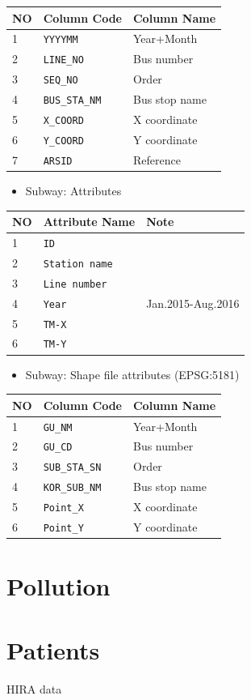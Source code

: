 \documentclass[]{book}
\providecommand{\tightlist}{%
  \setlength{\itemsep}{0pt}\setlength{\parskip}{0pt}}
\begin{document}
\begin{longtable}[]{@{}lll@{}}
\toprule
NO & Column Code & Column Name\tabularnewline
\midrule
\endhead
1 & \texttt{YYYYMM} & Year+Month\tabularnewline
2 & \texttt{LINE\_NO} & Bus number\tabularnewline
3 & \texttt{SEQ\_NO} & Order\tabularnewline
4 & \texttt{BUS\_STA\_NM} & Bus stop name\tabularnewline
5 & \texttt{X\_COORD} & X coordinate\tabularnewline
6 & \texttt{Y\_COORD} & Y coordinate\tabularnewline
7 & \texttt{ARSID} & Reference\tabularnewline
\bottomrule
\end{longtable}

\begin{itemize}
\tightlist
\item
  Subway: Attributes
\end{itemize}

\begin{longtable}[]{@{}lll@{}}
\toprule
NO & Attribute Name & Note\tabularnewline
\midrule
\endhead
1 & \texttt{ID} &\tabularnewline
2 & \texttt{Station\ name} &\tabularnewline
3 & \texttt{Line\ number} &\tabularnewline
4 & \texttt{Year} & Jan.2015-Aug.2016\tabularnewline
5 & \texttt{TM-X} &\tabularnewline
6 & \texttt{TM-Y} &\tabularnewline
\bottomrule
\end{longtable}

\begin{itemize}
\tightlist
\item
  Subway: Shape file attributes (EPSG:5181)
\end{itemize}

\begin{longtable}[]{@{}lll@{}}
\toprule
NO & Column Code & Column Name\tabularnewline
\midrule
\endhead
1 & \texttt{GU\_NM} & Year+Month\tabularnewline
2 & \texttt{GU\_CD} & Bus number\tabularnewline
3 & \texttt{SUB\_STA\_SN} & Order\tabularnewline
4 & \texttt{KOR\_SUB\_NM} & Bus stop name\tabularnewline
5 & \texttt{Point\_X} & X coordinate\tabularnewline
6 & \texttt{Point\_Y} & Y coordinate\tabularnewline
\bottomrule
\end{longtable}

\chapter{Pollution}\label{pollution}

\chapter{Patients}\label{patients}

HIRA data


\end{document}
